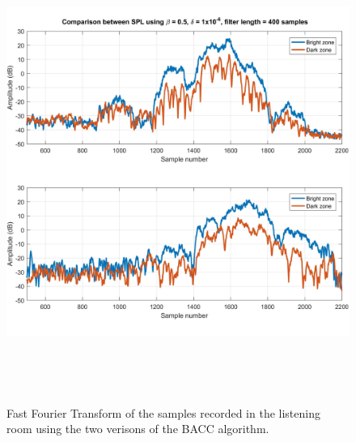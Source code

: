 \begin{figure}[H]
\centering
\includegraphics[width=15cm,height=15cm,keepaspectratio]
{Figures/fftfilterslisteningroom}
\decoRule
\caption[FFT listening room]{Fast Fourier Transform of the samples recorded in the listening room using the two verisons of the BACC algorithm.}
\label{fig:fftfilterslisteningroom}
\end{figure}

